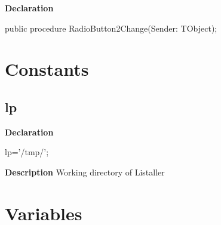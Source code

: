 \documentclass{report}
\newif\ifpdf
\begin{document}
\label{mainunit.TIWizFrm-RadioButton2Change}
\begin{list}{}{
\setlength{\itemindent}{0cm}
\setlength{\listparindent}{0cm}
\setlength{\leftmargin}{\evensidemargin}
\addtolength{\leftmargin}{\tmplength}
\settowidth{\labelsep}{X}
\addtolength{\leftmargin}{\labelsep}
\setlength{\labelwidth}{\tmplength}
}
\item[\textbf{Declaration}\hfill]
\ifpdf
\begin{flushleft}
\fi
\begin{ttfamily}
public procedure RadioButton2Change(Sender: TObject);\end{ttfamily}

\ifpdf
\end{flushleft}
\fi

\end{list}
\section{Constants}
\ifpdf
\subsection*{\large{\textbf{lp}}\normalsize\hspace{1ex}\hrulefill}
\else
\subsection*{lp}
\fi
\label{mainunit-lp}
\begin{list}{}{
\setlength{\itemindent}{0cm}
\setlength{\listparindent}{0cm}
\setlength{\leftmargin}{\evensidemargin}
\addtolength{\leftmargin}{\tmplength}
\settowidth{\labelsep}{X}
\addtolength{\leftmargin}{\labelsep}
\setlength{\labelwidth}{\tmplength}
}
\item[\textbf{Declaration}\hfill]
\ifpdf
\begin{flushleft}
\fi
\begin{ttfamily}
lp='/tmp/';\end{ttfamily}

\ifpdf
\end{flushleft}
\fi

\par
\item[\textbf{Description}]
Working directory of Listaller

\end{list}
\section{Variables}
\ifpdf
\end{document}

